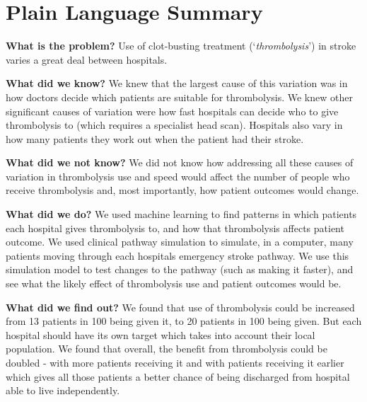 \section*{Plain Language Summary}

\textbf{What is the problem?} Use of clot-busting treatment (`\textit{thrombolysis}') in stroke varies a great deal between hospitals.

\textbf{What did we know?} We knew that the largest cause of this variation was in how doctors decide which patients are suitable for thrombolysis. We knew other significant causes of variation were how fast hospitals can decide who to give thrombolysis to (which requires a specialist head scan). Hospitals also vary in how many patients they work out when the patient had their stroke.

\textbf{What did we not know?} We did not know how addressing all these causes of variation in thrombolysis use and speed would affect the number of people who receive thrombolysis and, most importantly, how patient outcomes would change.

\textbf{What did we do?} We used machine learning to find patterns in which patients each hospital gives thrombolysis to, and how that thrombolysis affects patient outcome. We used clinical pathway simulation to simulate, in a computer, many patients moving through each hospitals emergency stroke pathway. We use this simulation model to test changes to the pathway (such as making it faster), and see what the likely effect of thrombolysis use and patient outcomes would be.

\textbf{What did we find out?} We found that use of thrombolysis could be increased from 13 patients in 100 being given it, to 20 patients in 100 being given. But each hospital should have its own target which takes into account their local population. We found that overall, the benefit from thrombolysis could be doubled - with more patients receiving it and with patients receiving it earlier which gives all those patients a better chance of being discharged from hospital able to live independently.